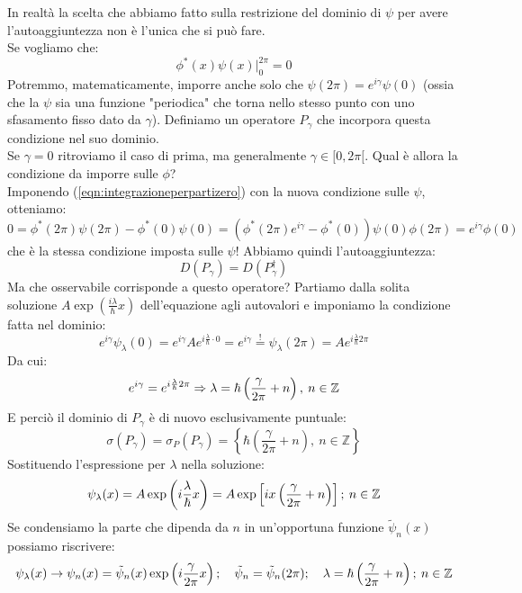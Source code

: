 \documentclass[../../FisicaTeorica.tex]{subfiles}
\begin{document}
In realtà la scelta che abbiamo fatto sulla restrizione del dominio di $\psi$ per avere l'autoaggiuntezza non è l'unica che si può fare.\\
Se vogliamo che:
\begin{equation}
\phi^\ast\left(x\right)\psi \left(x\right)\big|_0^{2\pi}=0
\label{eqn:integrazioneperpartizero}
\end{equation}
Potremmo, matematicamente, imporre anche solo che $\psi \left(2\pi\right)=e^{i\gamma}\psi \left(0\right)$ (ossia che la $\psi$ sia una funzione "periodica" che torna nello stesso punto con uno sfasamento fisso dato da $\gamma$). Definiamo un operatore $P_\gamma$ che incorpora questa condizione nel suo dominio.\\
Se $\gamma =0$ ritroviamo il caso di prima, ma generalmente $\gamma \in [0, 2\pi [$. Qual è allora la condizione da imporre sulle $\phi$?\\
Imponendo (\ref{eqn:integrazioneperpartizero}) con la nuova condizione sulle $\psi$, otteniamo:
\[
0= \phi^\ast\left(2\pi\right)\psi\left(2\pi\right)- \phi^\ast\left(0\right)\psi \left(0\right)=\left(\phi^\ast\left(2\pi\right)e^{i\gamma}-\phi^\ast\left(0\right)\right)\psi\left(0\right)\phi\left(2\pi\right)=e^{i\gamma}\phi \left(0\right)
\]
che è la stessa condizione imposta sulle $\psi$! Abbiamo quindi l'autoaggiuntezza:
\[
D\left(P_\gamma\right)=D\left(P_\gamma^\dag\right)
\]
Ma che osservabile corrisponde a questo operatore? Partiamo dalla solita soluzione $A\exp\left(\frac{i\lambda}{\hbar}x\right)$ dell'equazione agli autovalori e imponiamo la condizione fatta nel dominio:
\[
e^{i\gamma}\psi_\lambda\left(0\right)=e^{i\gamma}A e^{i\frac{\lambda}{\hbar}\cdot 0}=e^{i\gamma}\overset{!}{=}\psi_\lambda\left(2\pi\right)=A e^{i\frac{\lambda}{\hbar}2\pi}
\]
Da cui: 
\[
e^{i\gamma}=e^{i\frac{\lambda}{\hbar}2\pi}\Rightarrow \lambda = \hbar \left(\frac{\gamma}{2\pi} + n\right), \> n\in \mathbb{Z}
\]
E perciò il dominio di $P_\gamma$ è di nuovo esclusivamente puntuale:
\[
\sigma\left(P_\gamma\right)= \sigma_P\left(P_\gamma\right)= \left\{\hbar\left(\frac{\gamma}{2\pi}+n\right),\ n\in\mathbb{Z}\right\}
\]
Sostituendo l'espressione per $\lambda$ nella soluzione:
\[
\psi_\lambda(x) = A \exp\left(i\frac{\lambda}{\hbar}x\right) = A \exp\left [ix\left(\frac{\gamma}{2\pi}+n\right)\right ]; \> n\in\mathbb{Z}
\]
Se condensiamo la parte che dipenda da $n$ in un'opportuna funzione $\tilde{\psi}_n(x)$ possiamo riscrivere:
\[
\psi_\lambda(x) \rightarrow \psi_n(x) = \tilde{\psi}_n(x) \exp\left(i\frac{\gamma}{2\pi}x\right); \quad \tilde{\psi}_n = \tilde{\psi}_n(2\pi); \quad \lambda = \hbar \left(\frac{\gamma}{2\pi} + n\right); \> n\in \mathbb{Z}
\]
\end{document}
